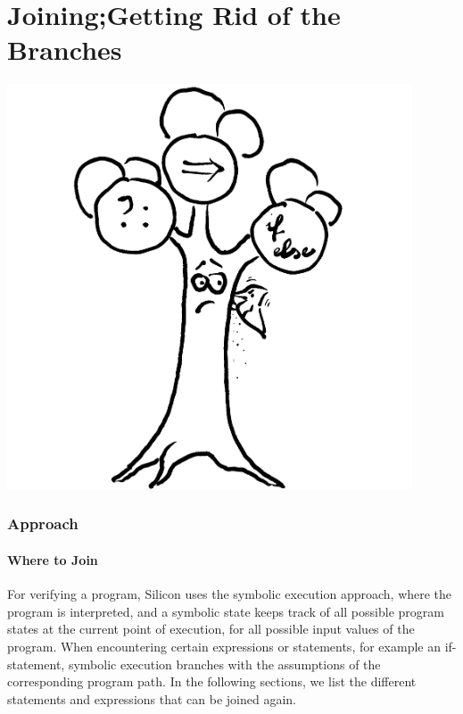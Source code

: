 \documentclass[11pt]{article}
\begin{document}
    \part{Joining;\newline Getting Rid of the Branches} \label{part-2}
    \begin{center}
        \vspace{2cm}
        \includegraphics[width=0.9\textwidth]{tree}
    \end{center}

    \newpage
    \section{Approach} \label{p2-approach}

    \subsection{Where to Join}

    For verifying a program, Silicon uses the symbolic execution approach, where the program is interpreted,
    and a symbolic state keeps track of all possible program states at the current point of execution, for all
    possible input values of the program. When encountering certain expressions or statements, for example an
    if-statement, symbolic execution branches with the assumptions of the corresponding program path.
    In the following sections, we list the different statements and expressions 
    that can be joined again.
\end{document}
